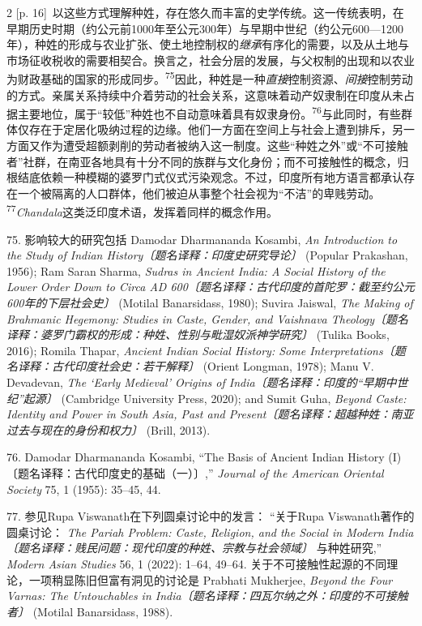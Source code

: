 \documentclass[10pt,a4paper]{article}
\begin{document}
\begin{paracol}{2}
{\scriptsize\color{gray} [p. 16]}\ 以这些方式理解种姓，存在悠久而丰富的史学传统。这一传统表明，在早期历史时期（约公元前1000年至公元300年）与早期中世纪（约公元600—1200年），种姓的形成与农业扩张、使土地控制权的\textit{继承}有序化的需要，以及从土地与市场征收税收的需要相契合。换言之，社会分层的发展，与父权制的出现和以农业为财政基础的国家的形成同\mbox{步。\textsuperscript{75}}因此，种姓是一种\textit{直接}控制资源、\textit{间接}控制劳动的方式。亲属关系持续中介着劳动的社会关系，这意味着动产奴隶制在印度从未占据主要地位，属于“较低”种姓也不自动意味着具有奴隶身\mbox{份。\textsuperscript{76}}与此同时，有些群体仅存在于定居化吸纳过程的边缘。他们一方面在空间上与社会上遭到排斥，另一方面又作为遭受超额剥削的劳动者被纳入这一制度。这些“种姓之外”或“不可接触者”社群，在南亚各地具有十分不同的族群与文化身份；而不可接触性的概念，归根结底依赖一种模糊的婆罗门式仪式污染观念。不过，印度所有地方语言都承认存在一个被隔离的人口群体，他们被迫从事整个社会视为“不洁”的卑贱劳\mbox{动。\textsuperscript{77}}\textit{Chandala}这类泛印度术语，发挥着同样的概念作用。\par{\small 75. 影响较大的研究包括 Damodar Dharmananda Kosambi, \textit{An Introduction to the Study of Indian History〔题名译释：印度史研究导论〕} (Popular Prakashan, 1956); Ram Saran Sharma, \textit{Sudras in Ancient India: A Social History of the Lower Order Down to Circa AD 600〔题名译释：古代印度的首陀罗：截至约公元600年的下层社会史〕} (Motilal Banarsidass, 1980); Suvira Jaiswal, \textit{The Making of Brahmanic Hegemony: Studies in Caste, Gender, and Vaishnava Theology〔题名译释：婆罗门霸权的形成：种姓、性别与毗湿奴派神学研究〕} (Tulika Books, 2016); Romila Thapar, \textit{Ancient Indian Social History: Some Interpretations〔题名译释：古代印度社会史：若干解释〕} (Orient Longman, 1978); Manu V. Devadevan, \textit{The ‘Early Medieval’ Origins of India〔题名译释：印度的“早期中世纪”起源〕} (Cambridge University Press, 2020); and Sumit Guha, \textit{Beyond Caste: Identity and Power in South Asia, Past and Present〔题名译释：超越种姓：南亚过去与现在的身份和权力〕} (Brill, 2013).\par}{\small 76. Damodar Dharmananda Kosambi, “The Basis of Ancient Indian History (I)〔题名译释：古代印度史的基础（一）〕,” \textit{Journal of the American Oriental Society} 75, 1 (1955): 35–45, 44.\par}{\small 77. 参见Rupa Viswanath在下列圆桌讨论中的发言： “关于Rupa Viswanath著作的圆桌讨论： \textit{The Pariah Problem: Caste, Religion, and the Social in Modern India〔题名译释：贱民问题：现代印度的种姓、宗教与社会领域〕} 与种姓研究,” \textit{Modern Asian Studies} 56, 1 (2022): 1–64, 49–64. 关于不可接触性起源的不同理论，一项稍显陈旧但富有洞见的讨论是 Prabhati Mukherjee, \textit{Beyond the Four Varnas: The Untouchables in India〔题名译释：四瓦尔纳之外：印度的不可接触者〕} (Motilal Banarsidass, 1988).\par}

\end{paracol}
\end{document}
